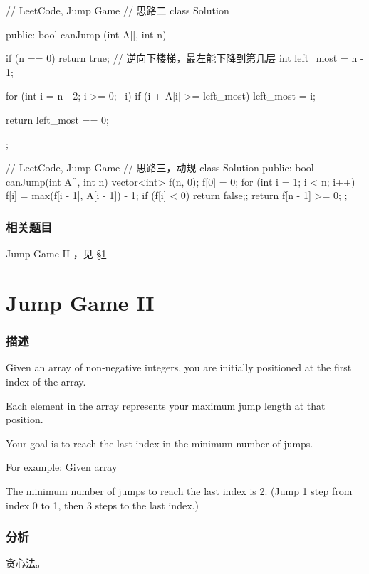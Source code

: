 \begin{Code}
// LeetCode, Jump Game
// 思路二
class Solution {
public:
    bool canJump (int A[], int n) {
        if (n == 0) return true;
        // 逆向下楼梯，最左能下降到第几层
        int left_most = n - 1;

        for (int i = n - 2; i >= 0; --i)
            if (i + A[i] >= left_most)
                left_most = i;

        return left_most == 0;
    }
};
\end{Code}

\begin{Code}
// LeetCode, Jump Game
// 思路三，动规
class Solution {
public:
    bool canJump(int A[], int n) {
        vector<int> f(n, 0);
        f[0] = 0;
        for (int i = 1; i < n; i++) {
            f[i] = max(f[i - 1], A[i - 1]) - 1;
            if (f[i] < 0) return false;;
        }
        return f[n - 1] >= 0;
    }
};
\end{Code}


\subsubsection{相关题目}
\begindot
\item Jump Game II ，见 \S \ref{sec:jump-game-ii}
\myenddot


\section{Jump Game II} %
\label{sec:jump-game-ii}


\subsubsection{描述}
Given an array of non-negative integers, you are initially positioned at the first index of the array.

Each element in the array represents your maximum jump length at that position.

Your goal is to reach the last index in the minimum number of jumps.

For example:
Given array 

The minimum number of jumps to reach the last index is 2. (Jump 1 step from index 0 to 1, then 3 steps to the last index.)


\subsubsection{分析}
贪心法。


